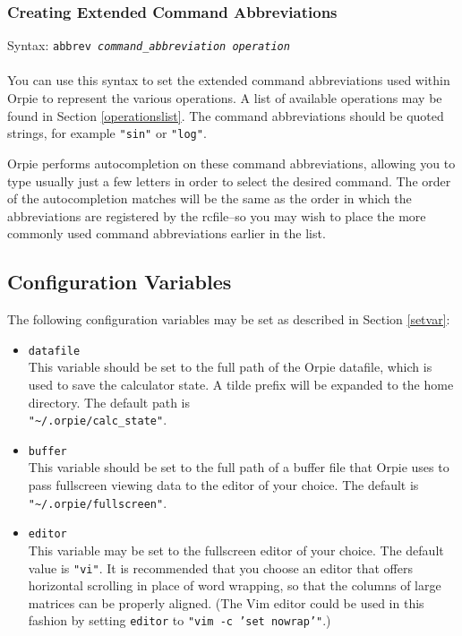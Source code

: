 \documentclass[11pt,notitlepage]{article}
\begin{document}
\subsubsection{Creating Extended Command Abbreviations}
\label{abbreviations}
Syntax: {\tt abbrev {\em command\_abbreviation operation}} \\ \\
You can use this syntax to set the extended command abbreviations used within
Orpie to represent the various operations.  A list of available operations may be found
in Section \ref{operationslist}.  The command abbreviations should be quoted strings,
for example {\tt "sin"} or {\tt "log"}.

Orpie performs autocompletion on these command abbreviations, allowing you to type
usually just a few letters in order to select the desired command.  The order of the
autocompletion matches will be the same as the order in which the abbreviations are
registered by the rcfile--so you may wish to place the more commonly used command
abbreviations earlier in the list.

\subsection{Configuration Variables}
\label{variables}
The following configuration variables may be set as described in Section \ref{setvar}:
\begin{itemize}
   \item {\tt datafile} \\
      This variable should be set to the full path of the Orpie datafile, which is used
      to save the calculator state.  A tilde prefix will be expanded to the home
      directory.  The default path is \\
      {\tt "\~{}/.orpie/calc\_state"}.
   \item {\tt buffer} \\
      This variable should be set to the full path of a buffer file that Orpie uses
      to pass fullscreen viewing data to the editor of your choice.  The default
      is {\tt "\~{}/.orpie/fullscreen"}.
   \item {\tt editor} \\
      This variable may be set to the fullscreen editor of your choice.  The default
      value is {\tt "vi"}.  It is recommended that you choose an editor that offers
      horizontal scrolling in place of word wrapping, so that the columns of large 
      matrices can be properly aligned.  (The Vim editor could be used in this fashion
      by setting {\tt editor} to {\tt "vim -c 'set nowrap'"}.)
\end{itemize}
\end{document}
